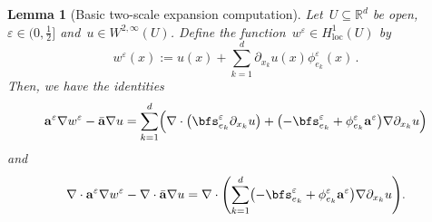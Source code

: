 \documentclass[11pt,twoside]{article} %
\numberwithin{equation}{section}
\newtheorem{lemma}[theorem]{Lemma}
\theoremstyle{definition}
\let\originalleft\left
\let\originalright\right
\renewcommand{\left}{\mathopen{}\mathclose\bgroup\originalleft}
\renewcommand{\right}{\aftergroup\egroup\originalright}
\newcommand*{\R}{\ensuremath{\mathbb{R}}}
\newcommand*{\Rd}{\ensuremath{\mathbb{R}^d}}
\newcommand{\eps}{\varepsilon}
\newcommand{\qand}{\quad \mbox{and} \quad }
\newcommand{\ep}{\eps}
\renewcommand{\a}{\mathbf{a}}
\newcommand{\ahom}{\bar{\a}}
\begin{document}
\begin{lemma}[Basic two-scale expansion computation]
\label{l.twoscale}
Let~$U\subseteq \Rd$ be open,~$\ep \in \bigl(0,\tfrac12\bigr]$ and~$u\in W^{2,\infty}(U)$. 
Define the function~$w^\ep \in H^1_{\mathrm{loc}}(U)$ by
\begin{equation}
\label{e.twoscale.wep}
w^\ep (x) 
:= 
u(x) + \sum_{k=1}^d \partial_{x_k}u(x) \phi_{e_k}^\ep(x)
\,. 
\end{equation}
Then, we have the identities
\begin{equation}
\label{e.twoscale.flux}
\a^\ep \nabla w^\ep - \ahom\nabla u
=
\sum_{k=1}^d \Bigl( 
\nabla \cdot \left( \bfs^\ep_{e_k}  \partial_{x_k} u  \right)
+
\bigl( - \bfs^\ep_{e_k} + \phi_{e_k}^\ep \a^\ep \bigr) \nabla \partial_{x_k} u
\Bigr)
\end{equation}
and
\begin{align}
\label{e.twoscale.error}
\nabla \cdot \a^\ep \nabla w^\ep 
-
\nabla\cdot \ahom \nabla u
= 
\nabla\cdot \left( \sum_{k=1}^d 
\left(
- \bfs_{e_k}^\ep 
+
\phi_{e_k}^\ep \a^\ep 
\right) \nabla \partial_{x_k} u \right).
\end{align}
\end{lemma}
\end{document}
